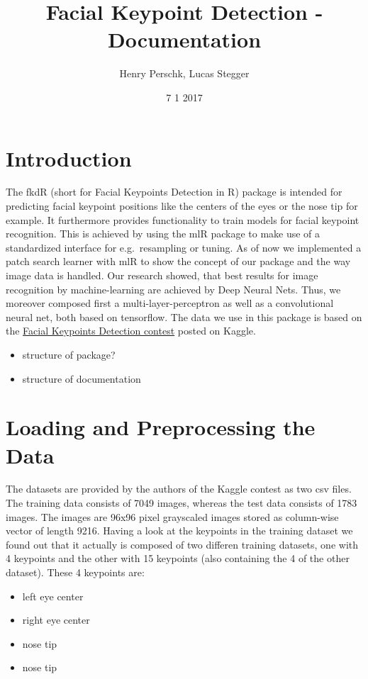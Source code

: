 \documentclass[]{article}
\title{Facial Keypoint Detection - Documentation}
\author{Henry Perschk, Lucas Stegger}
\date{7 1 2017}
\providecommand{\tightlist}{%
  \setlength{\itemsep}{0pt}\setlength{\parskip}{0pt}}
\begin{document}
\maketitle

{
\setcounter{tocdepth}{2}
\tableofcontents
}
\section{Introduction}\label{introduction}

The fkdR (short for Facial Keypoints Detection in R) package is intended
for predicting facial keypoint positions like the centers of the eyes or
the nose tip for example. It furthermore provides functionality to train
models for facial keypoint recognition. This is achieved by using the
mlR package to make use of a standardized interface for e.g.~resampling
or tuning. As of now we implemented a patch search learner with mlR to
show the concept of our package and the way image data is handled. Our
research showed, that best results for image recognition by
machine-learning are achieved by Deep Neural Nets. Thus, we moreover
composed first a multi-layer-perceptron as well as a convolutional
neural net, both based on tensorflow. The data we use in this package is
based on the
\href{https://www.kaggle.com/c/facial-keypoints-detection}{Facial
Keypoints Detection contest} posted on Kaggle.

\begin{itemize}
\tightlist
\item
  structure of package?
\item
  structure of documentation
\end{itemize}

\section{Loading and Preprocessing the
Data}\label{loading-and-preprocessing-the-data}

The datasets are provided by the authors of the Kaggle contest as two
csv files. The training data consists of 7049 images, whereas the test
data consists of 1783 images. The images are 96x96 pixel grayscaled
images stored as column-wise vector of length 9216. Having a look at the
keypoints in the training dataset we found out that it actually is
composed of two differen training datasets, one with 4 keypoints and the
other with 15 keypoints (also containing the 4 of the other dataset).
These 4 keypoints are:

\begin{itemize}
\tightlist
\item
  left eye center
\item
  right eye center
\item
  nose tip
\item
  nose tip
\end{itemize}
\end{document}
